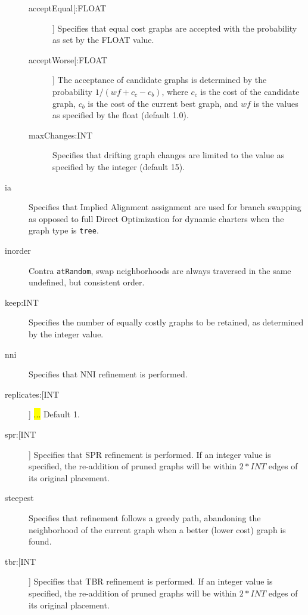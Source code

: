 \begin{description}
			\begin{description}
			
			\item[acceptEqual[:FLOAT]] Specifies that equal cost graphs are accepted with the
			probability as set by the FLOAT value. 
			
			\item[acceptWorse[:FLOAT]] The acceptance of candidate graphs is determined by the 
			probability $1/ (wf + c_c - c_b)$, where $c_c$ is the cost of the candidate graph, $c_b$ 
			is the cost of the current best graph, and $wf$ is the values as specified by the float 
			(default 1.0). 	
			
			\item[maxChanges:INT] Specifies that drifting graph changes are limited to the 
			value as specified by the integer (default 15).
			
			\end{description}
		
		\item[ia] Specifies that Implied Alignment \citep{Wheeler2003} assignment are used for 
		branch swapping as opposed to full Direct Optimization for dynamic charters when the 
		graph type is \texttt{tree}.
		
		\item[inorder] Contra \texttt{atRandom}, swap neighborhoods are always traversed 
		in the same undefined, but consistent order.
		
		\item[keep:INT] Specifies the number of equally costly graphs to be retained, as
		determined by the integer value.		
		
		\item[nni] Specifies that NNI refinement \citep{CaminandSokal1965, Robinson1971} 
		is performed.
		
		\item[replicates:[INT]] \hl{...} Default 1.
		
		\item[spr:[INT]] Specifies that SPR refinement \citep{Dayhoff1969} is performed. If an 
		integer value is specified, the re-addition of pruned graphs will be within $2 * INT$ 
		edges of its original placement.
		
		\item[steepest] Specifies that refinement follows a greedy path, abandoning the 
		neighborhood of the current graph when a better (lower cost) graph is found.  		
		
		\item[tbr:[INT]] Specifies that TBR refinement \citep{Farris1988, swofford1990a} 
		is performed. If an integer value is specified, the re-addition of pruned graphs 
		will be within $2 * INT$ edges of its original placement.
		\end{description}	
		
